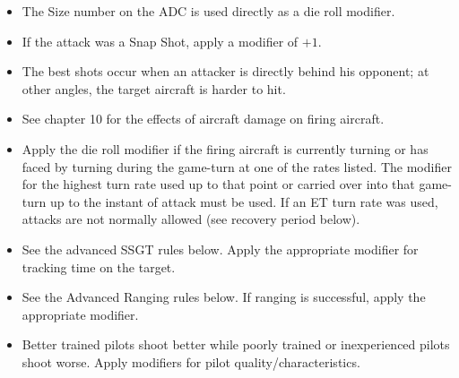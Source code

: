 \begin{itemize}

    \item{} 
    The Size number on the ADC is used directly as a die roll modifier.

    \item{} 
    If the attack was a Snap Shot, apply a modifier of $+1$.

    \item{}
    The best shots occur when an attacker is directly behind his opponent; at other angles, the target aircraft is harder to hit. 


    \item{} 
    See chapter 10 for the effects of aircraft damage on firing aircraft.

    \item
     Apply the die roll modifier if the firing aircraft is currently turning or has faced by turning during the game-turn at one of the rates listed. The modifier for the highest turn rate used up to that point or carried over into that game-turn up to the instant of attack must be used. If an ET turn rate was used, attacks are not normally allowed (see recovery period below).

    \item{} 
    See the advanced SSGT rules below. Apply the appropriate modifier for tracking time on the target.

    \item{} 
    See the Advanced Ranging rules below. If ranging is successful, apply the appropriate modifier.

    \item{} Better trained pilots shoot better while poorly trained or inexperienced pilots shoot worse. Apply modifiers for pilot quality/characteristics.

\end{itemize}


